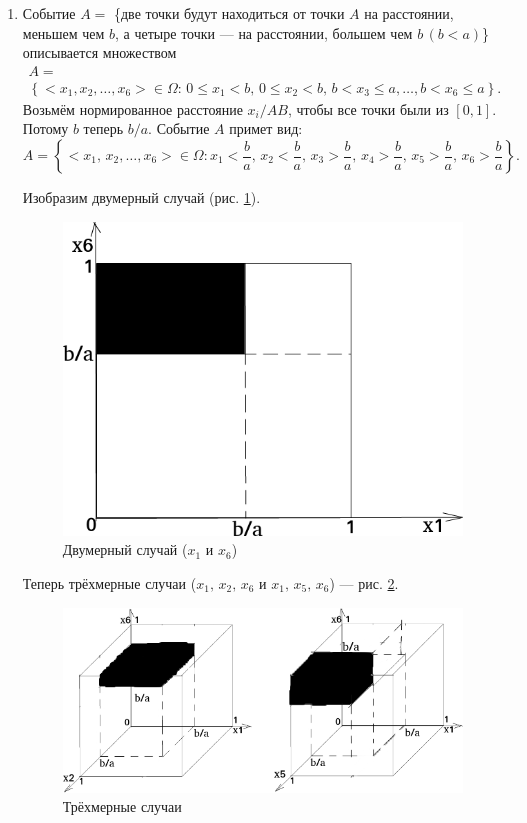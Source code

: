 \begin{enumerate}[label=\alph*)]
\item Событие $A =$
\{две точки будут находиться от точки $A$ на расстоянии,
меньшем чем $b$, а четыре точки --- на расстоянии,
большем чем $b \, \left( b<a \right) $\}
описывается множеством
\begin{equation*}
\begin{split}
A = \\
\left\{ <x_1, x_2, \dotsc, x_6> \in \Omega: \,
0 \leq x_1 < b, \,
0 \leq x_2 < b, \,
b < x_3 \leq a, \dotsc,
b < x_6 \leq a \right\}.
\end{split}
\end{equation*}
Возьмём нормированное расстояние $x_i/AB$, чтобы все точки были из $ \left[ 0, 1 \right] $.
Потому $b$ теперь $b/a$.
Событие $A$ примет вид:
$$A =
\left\{ <x_1, \, x_2, \dotsc, x_6> \in \Omega:
x_1 < \frac{b}{a}, \,
x_2 < \frac{b}{a}, \,
x_3 > \frac{b}{a}, \,
x_4 > \frac{b}{a}, \,
x_5 > \frac{b}{a}, \,
x_6 > \frac{b}{a} \right\}.$$

Изобразим двумерный случай (рис. \ref{fig:47}).

\begin{figure}[h!]
  \centering
  \includegraphics[width=.4\textwidth]{./pictures/4_7.png}
  \caption{Двумерный случай ($x_1$ и $x_6$)}
  \label{fig:47}
\end{figure}

Теперь трёхмерные случаи ($x_1, \, x_2, \, x_6$ и $x_1, \, x_5, \, x_6$) --- рис. \ref{fig:471}.

\begin{figure}[h!]
  \centering
  \includegraphics[width=.7\textwidth]{./pictures/4_7_1.png}
  \caption{Трёхмерные случаи}
  \label{fig:471}
\end{figure}


\end{enumerate}
